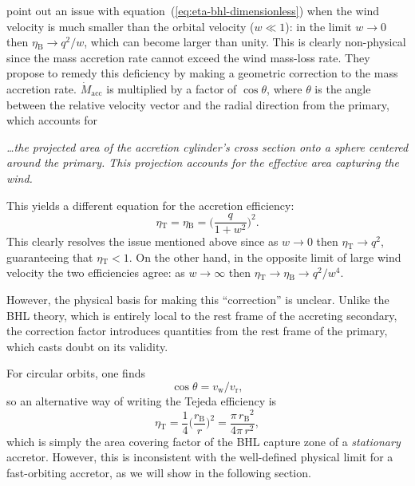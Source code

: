 \documentclass[useAMS, usenatbib, a4paper]{mnras}
\newcommand\wind{\ensuremath{_{\mathrm{w}}}}
\newcommand\rel{\ensuremath{_{\mathrm{r}}}}
\newcommand\bhl{\ensuremath{_{\mathrm{\scriptscriptstyle B}}}}
\newcommand\Tej{\ensuremath{_{\mathrm{\scriptscriptstyle T}}}}
\newcommand\acc{\ensuremath{_{\mathrm{acc}}}}
\newcommand\mdacc{\ensuremath{\dot M\acc}}
\begin{document}
\cite{Tejeda:2025a} point out an issue with equation~(\ref{eq:eta-bhl-dimensionless}) when the wind velocity is much smaller than the orbital velocity (\(w \ll 1\)): in the limit \(w \to 0\) then \(\eta\bhl \to q^2 / w\), which can become larger than unity.
This is clearly non-physical since the mass accretion rate cannot exceed the wind mass-loss rate.
They propose to remedy this deficiency by making a geometric correction
to the mass accretion rate.
\(\mdacc\) is multiplied by a factor of \(\cos\theta\),
where \(\theta\) is the angle between the relative velocity vector
and the radial direction from the primary,
which accounts for
\begin{center}
  \begin{minipage}{0.8\linewidth}\small\itshape
    \dots the projected area of the accretion cylinder's
    cross section onto a sphere centered around the primary. This
    projection accounts for the effective area capturing the wind.
  \end{minipage}
\end{center}
This yields a different equation for the accretion efficiency:
\begin{equation}
  \label{eq:eta-tejeda-dimensionless}
  \eta\Tej = \eta\bhl = \biggl( \frac{q}{1 + w^2} \biggr)^2 .
\end{equation}
This clearly resolves the issue mentioned above since as
\(w \to 0\) then \(\eta\Tej \to q^2 \), guaranteeing that \(\eta\Tej < 1  \).
On the other hand, in the opposite limit of large wind velocity
the two efficiencies agree: as \(w \to \infty\) then \(\eta\Tej \to \eta\bhl \to q^2 / w^4\).

However, the physical basis for making this ``correction'' is unclear.
Unlike the BHL theory, which is entirely local
to the rest frame of the accreting secondary,
the correction factor introduces quantities from the rest frame of the primary,
which casts doubt on its validity.

For circular orbits, one finds
\begin{equation}
  \label{eq:cos-theta}
  \cos\theta = v\wind / v\rel ,
\end{equation}
so an alternative way of writing the Tejeda efficiency is
\begin{equation}
  \label{eq:eta-tejeda}
  \eta\Tej = \frac{1}{4}
  \biggl( \frac{r\bhl}{r}\biggr)^2
  =  \frac{\pi \, r\bhl^2}{4 \pi \, r^2} ,
\end{equation}
which is simply the area covering factor of the BHL capture zone
of a \emph{stationary} accretor.
However, this is inconsistent with the well-defined physical limit
for a fast-orbiting accretor, as we will show in the following section.
\end{document}
